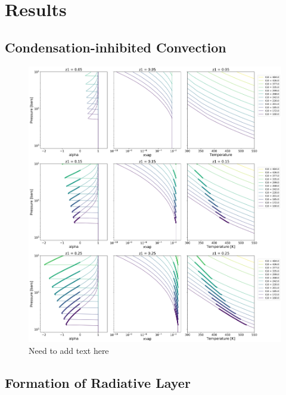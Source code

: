\documentclass[11pt]{ucscthesisbs}
\begin{document}
\chapter{Results}

\section{Condensation-inhibited Convection}

\begin{figure}[ht!]
 \centerline{
  \includegraphics[width=7.0in]{figures/convection_inhibited_2.png}
 }
\caption[Inhibition of convection on Uranus]
{Need to add text here}
\label{fig:uranus}
\end{figure}

\section{Formation of Radiative Layer}
\end{document}
